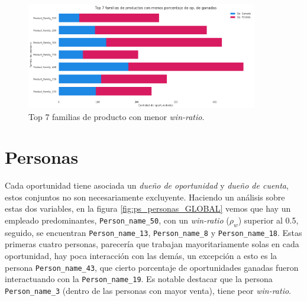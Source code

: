 \documentclass[titlepage,a4paper]{article}
\begin{document}
\begin{figure}[H]
\centering
\includegraphics[width=0.9\textwidth]{images/bp_top_familia_de_productos_con_menos_winratio.png}
\cprotect\caption{\label{fig:bp_top_familia_de_productos_con_menos_winratio} Top 7 familias de producto con menor \textit{win-ratio}. }
\end{figure}

\section{Personas}
Cada oportunidad tiene asociada un \textit{dueño de oportunidad} y  \textit{dueño de cuenta}, estos conjuntos no son necesariamente excluyente. Haciendo un análisis sobre estas dos variables, en la figura \ref{fig:ps_personas_GLOBAL} vemos que hay un empleado predominantes, \verb|Person_name_50|, con un \textit{win-ratio} ($\rho_w$) superior al 0.5, seguido, se encuentran \verb|Person_name_13|, \verb|Person_name_8| y \verb|Person_name_18|. Estas primeras cuatro personas, parecería que trabajan mayoritariamente solas en cada oportunidad, hay poca interacción con las demás, un excepción a esto es la persona \verb|Person_name_43|, que cierto porcentaje de oportunidades ganadas fueron interactuando con la \verb|Person_name_19|. Es notable destacar que la persona \verb|Person_name_3| (dentro de las personas con mayor venta), tiene peor \textit{win-ratio}.
\end{document}
